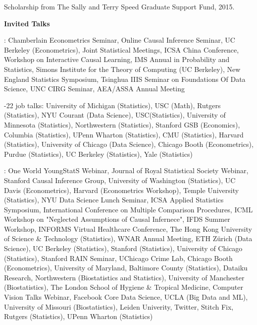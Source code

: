 \documentclass{article}
\begin{document}
\vspace{2mm}
Scholarship from The Sally and Terry Speed Graduate Support Fund, 2015.

\vspace{5mm}

\begin{large}
\noindent \textbf{Invited Talks}
\end{large}

\vspace{4mm}
: Chamberlain Econometrics Seminar, Online Causal Inference Seminar, UC Berkeley (Econometrics), Joint Statistical Meetings, ICSA China Conference, Workshop on Interactive Causal Learning, IMS Annual in Probability and Statistics, Simons Institute for the Theory of Computing (UC Berkeley), New England Statistics Symposium, Tsinghua IIIS Seminar on Foundations Of Data Science, UNC CIRG Seminar, AEA/ASSA Annual Meeting

\vspace{4mm}
-22 job talks: University of Michigan (Statistics), USC (Math), Rutgers (Statistics), NYU Courant (Data Science), USC(Statistics), University of Minnesota (Statistics), Northwestern (Statistics), Stanford GSB (Economics), Columbia (Statistics), UPenn Wharton (Statistics), CMU (Statistics), Harvard (Statistics), University of Chicago (Data Science), Chicago Booth (Econometrics), Purdue (Statistics), UC Berkeley (Statistics), Yale (Statistics)

\vspace{4mm}
: One World YoungStatS Webinar, Journal of Royal Statistical Society Webinar, Stanford Causal Inference Group, University of Washington (Statistics), UC Davis (Econometrics), Harvard (Econometrics Workshop), Temple University (Statistics), NYU Data Science Lunch Seminar, ICSA Applied Statistics Symposium, International Conference on Multiple Comparison Procedures, ICML Workshop on "Neglected Assumptions of Causal Infernece", IFDS Summer Workshop, INFORMS Virtual Healthcare Conference, The Hong Kong University of Science \& Technology (Statistics), WNAR Annual Meeting, ETH Z\"{u}rich (Data Science), UC Berkeley (Statistics), Stanford (Statistics), University of Chicago (Statistics), Stanford RAIN Seminar, UChicago Crime Lab, Chicago Booth (Econometrics), University of Maryland, Baltimore County (Statistics), Dataiku Research, Northwestern (Biostatistics and Statistics), University of Manchester (Biostatistics), The London School of Hygiene \& Tropical Medicine, Computer Vision Talks Webinar, Facebook Core Data Science, UCLA (Big Data and ML), University of Missouri (Biostatistics), Leiden Univerity, Twitter, Stitch Fix, Rutgers (Statistics), UPenn Wharton (Statistics)
\end{document}
